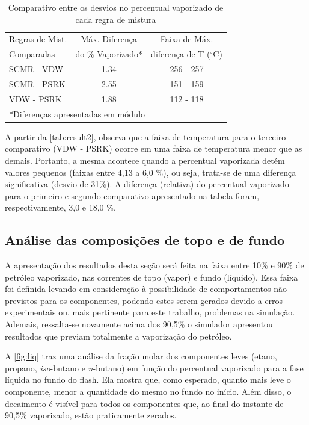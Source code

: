 \clearpage
\begin{table}[htb]
\renewcommand{\arraystretch}{1.3}
\caption{Comparativo entre os desvios no percentual vaporizado de cada regra de
mistura}
\footnotesize
\center 
\begin{tabular}{lcc}   
\toprule
  {Regras de Mist.} &{Máx. Diferença}&{Faixa de Máx.} \\
   {Comparadas}&{do \% Vaporizado*}&{diferença de T ($^\circ$C)} \\
\midrule 
{SCMR - VDW}	&	1.34	&	{256 - 257}	 \\
{SCMR - PSRK}	&	2.55	&	{151 - 159}	 \\
{VDW - PSRK}	&	1.88	&	{112 - 118}	 \\
\bottomrule
\multicolumn{3}{l}{*Diferenças apresentadas em módulo}
\end{tabular}
\label{tab:result2}
\end{table}

A partir da \autoref{tab:result2}, observa-que a faixa de temperatura para o
terceiro comparativo (VDW - PSRK) ocorre em uma faixa de temperatura menor que
as demais. Portanto, a mesma acontece quando a percentual vaporizada detém
valores pequenos (faixas entre 4,13 a 6,0 {\%}), ou seja, trata-se de uma
diferença significativa (desvio de 31{\%}). A diferença (relativa) do percentual
vaporizado para o primeiro e segundo comparativo apresentado na tabela foram,
respectivamente, 3,0 e 18,0 {\%}.


\subsection{Análise das composições de topo e de fundo}

A apresentação dos resultados desta seção será feita na faixa entre
10{\%} e 90{\%} de petróleo vaporizado, nas correntes de topo (vapor) e fundo
(líquido). Essa faixa foi definida levando em
consideração à possibilidade de comportamentos não previstos para os componentes, 
podendo estes serem gerados devido a erros experimentais ou, mais pertinente 
para este trabalho, problemas na simulação. Ademais, ressalta-se novamente 
acima dos 90,5{\%} o simulador apresentou resultados que previam totalmente
a vaporização do petróleo.

A \autoref{fig:liq} traz uma análise da fração molar dos componentes leves 
(etano, propano, \emph{iso}-butano e \emph{n}-butano) em função do percentual
vaporizado para a fase líquida no fundo do flash. Ela mostra que, como esperado, quanto
 mais leve o componente, menor a quantidade do mesmo no fundo no início. Além 
 disso, o decaimento é visível para todos os componentes que, ao final
 do instante de 90,5{\%} vaporizado, estão praticamente zerados.

